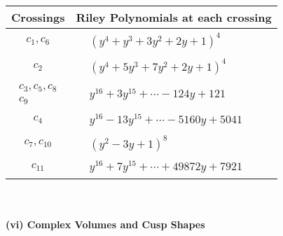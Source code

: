 \documentclass[1p]{elsarticle_modified}
\theoremstyle{definition}
\begin{document}
\begin{tabular}{m{50pt}|m{274pt}}
Crossings & \hspace{64pt}Riley Polynomials at each crossing \\
\hline $$\begin{aligned}c_{1},c_{6}\end{aligned}$$&$\begin{aligned}
&(y^4+y^3+3 y^2+2 y+1)^4
\end{aligned}$\\
\hline $$\begin{aligned}c_{2}\end{aligned}$$&$\begin{aligned}
&(y^4+5 y^3+7 y^2+2 y+1)^4
\end{aligned}$\\
\hline $$\begin{aligned}c_{3},c_{5},c_{8}\\c_{9}\end{aligned}$$&$\begin{aligned}
&y^{16}+3 y^{15}+\cdots-124 y+121
\end{aligned}$\\
\hline $$\begin{aligned}c_{4}\end{aligned}$$&$\begin{aligned}
&y^{16}-13 y^{15}+\cdots-5160 y+5041
\end{aligned}$\\
\hline $$\begin{aligned}c_{7},c_{10}\end{aligned}$$&$\begin{aligned}
&(y^2-3 y+1)^8
\end{aligned}$\\
\hline $$\begin{aligned}c_{11}\end{aligned}$$&$\begin{aligned}
&y^{16}+7 y^{15}+\cdots+49872 y+7921
\end{aligned}$\\
\hline
\end{tabular}\\~\\
\newpage\flushleft \textbf{(vi) Complex Volumes and Cusp Shapes}
\end{document}
